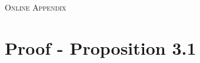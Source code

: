 \documentclass[12pt]{article}
\theoremstyle{prop}
\begin{document}




\clearpage \newpage
\begin{small}
	
	
\end{small}

\newpage\clearpage
\setcounter{page}{1}

\appendix

\begin{center}
	\textsc{{\Large {Online Appendix}}}
\end{center}
\vspace*{.5cm}


\section{Proof - Proposition 3.1}
\label{app:Math_merger}
\end{document}
